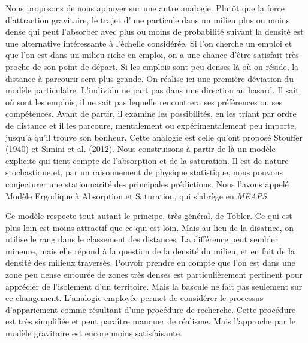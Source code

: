 \documentclass[
  10pt,
  a4paper,
  numbers=noendperiod,
  DIV=9]{scrreprt}
\begin{document}
Nous proposons de nous appuyer sur une autre analogie. Plutôt que la
force d'attraction gravitaire, le trajet d'une particule dans un milieu
plus ou moins dense qui peut l'absorber avec plus ou moins de
probabilité suivant la densité est une alternative intéressante à
l'échelle considérée. Si l'on cherche un emploi et que l'on est dans un
milieu riche en emploi, on a une chance d'être satisfait très proche de
son point de départ. Si les emplois sont peu denses là où on réside, la
distance à parcourir sera plus grande. On réalise ici une première
déviation du modèle particulaire. L'individu ne part pas dans une
direction au hasard. Il sait où sont les emplois, il ne sait pas
lequelle rencontrera ses préférences ou ses compétences. Avant de
partir, il examine les possibilités, en les triant par ordre de distance
et il les parcoure, mentalement ou expérimentalement peu importe,
jusqu'à qu'il trouve son bonheur. Cette analogie est celle qu'ont
proposé Stouffer (1940) et Simini et al. (2012). Nous construisons à
partir de là un modèle explicite qui tient compte de l'absorption et de
la saturation. Il est de nature stochastique et, par un raisonnement de
physique statistique, nous pouvons conjecturer une stationnarité des
principales prédictions. Nous l'avons appelé Modèle Ergodique à
Absorption et Saturation, qui s'abrège en \emph{MEAPS}.

Ce modèle respecte tout autant le principe, très général, de Tobler. Ce
qui est plus loin est moins attractif que ce qui est loin. Mais au lieu
de la disatnce, on utilise le rang dans le classement des distances. La
différence peut sembler mineure, mais elle répond à la question de la
densité du milieu, et en fait de la densité des milieux traversés.
Pouvoir prendre en compte que l'on est dans une zone peu dense entourée
de zones très denses est particulièrement pertinent pour apprécier de
l'isolement d'un territoire. Mais la bascule ne fait pas seulement sur
ce changement. L'analogie employée permet de considérer le processus
d'appariement comme résultant d'une procédure de recherche. Cette
procédure est très simplifiée et peut paraître manquer de réalisme. Mais
l'approche par le modèle gravitaire est encore moins satisfaisante.
\end{document}
